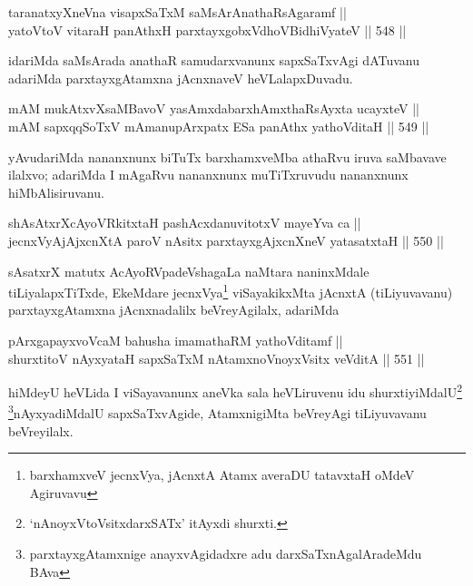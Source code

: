 
\begin{shl}
taranatxyXneVna visapxSaTxM saMsArAnathaRsAgaramf || \\
yatoV\s toV vitaraH panAthxH parxtayxgobxVdhoV\s BidhiVyateV \hfill || 548 ||  
\end{shl}

\begin{artha}
idariMda saMsArada anathaR samudarxvanunx sapxSaTxvAgi dATuvanu
adariMda parxtayxgAtamxna jAcnxnaveV heVLalapxDuvadu.
\end{artha}

\begin{shl}
mAM mukAtxvX\s saMBavoV yasAmxdabarxhAmxthaRsAyxta ucayxteV || \\
mAM sapxqqSoTxV mAmanupArxpatx ESa panAthx yathoVditaH \hfill || 549 ||  
\end{shl}

\begin{artha}
yAvudariMda nananxnunx biTuTx barxhamxveMba athaRvu iruva saMbavave
ilalxvo; adariMda I mAgaRvu nananxnunx muTiTxruvudu nananxnunx hiMbAlisiruvanu.
\end{artha}


\begin{shl}
shAsAtxrXcAyoVRkitxtaH pashAcxdanuvitotxV mayeYva ca || \\
jecnxVyAjAjxcnXtA paroV nAsitx parxtayxgAjxcnXneV yatasatxtaH \hfill || 550 ||  
\end{shl}

\begin{artha}
sAsatxrX matutx AcAyoRVpadeVshagaLa naMtara naninxMdale
tiLiyalapxTiTxde, EkeMdare jecnxVya\footnote{barxhamxveV jecnxVya,
jAcnxtA Atamx averaDU tatavxtaH oMdeV Agiruvavu} viSayakikxMta jAcnxtA
(tiLiyuvavanu) parxtayxgAtamxna jAcnxnadalilx beVreyAgilalx, adariMda 
\end{artha}

\begin{shl}
pArxgapayxvoVcaM bahusha imamathaRM yathoVditamf || \\
shurxtitoV nAyxyataH sapxSaTxM nA\s \s tamxnoV\s noyxV\s sitx veVditA \hfill || 551 ||  
\end{shl}

\begin{artha}
hiMdeyU heVLida  I viSayavanunx aneVka sala heVLiruvenu idu
shurxtiyiMdalU\footnote{`nAnoyxVtoV\s sitxdarxSATx' itAyxdi
shurxti.} \footnote{parxtayxgAtamxnige anayxvAgidadxre adu
darxSaTxnAgalAradeMdu BAva}nAyxyadiMdalU sapxSaTxvAgide,
AtamxnigiMta beVreyAgi tiLiyuvavanu beVreyilalx.
\end{artha}

